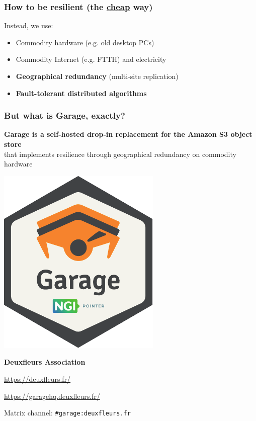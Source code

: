 \documentclass[aspectratio=169]{beamer}
\begin{document}
\begin{frame}
	\frametitle{How to be resilient (the \underline{\textbf{cheap}} way)}

	Instead, we use:
	\vspace{1em}
	\begin{itemize}
		\item Commodity hardware (e.g. old desktop PCs)
			\vspace{.5em}
		\item<2-> Commodity Internet (e.g. FTTH) and electricity
			\vspace{.5em}
		\item<3-> \textbf{Geographical redundancy} (multi-site replication)
			\vspace{.5em}
		\item<4-> \textbf{Fault-tolerant distributed algorithms}
	\end{itemize}
	\vspace{1em}
\end{frame}

\begin{frame}
	\frametitle{But what is Garage, exactly?}
	\textbf{Garage is a self-hosted drop-in replacement for the Amazon S3 object store}\\
	\vspace{.5em}
	that implements resilience through geographical redundancy on commodity hardware

	\vspace{1em}

	\vspace{1em}

	\vspace{1em}
\end{frame}

\begin{frame}
	\centering
	\includegraphics[width=.3\linewidth]{../../sticker/Garage.pdf}
	\vspace{1em}

	{\large\bf Deuxfleurs Association}
	\vspace{1em}

	\url{https://deuxfleurs.fr/}

	\url{https://garagehq.deuxfleurs.fr/}

	Matrix channel: \texttt{\#garage:deuxfleurs.fr}
\end{frame}
\end{document}
